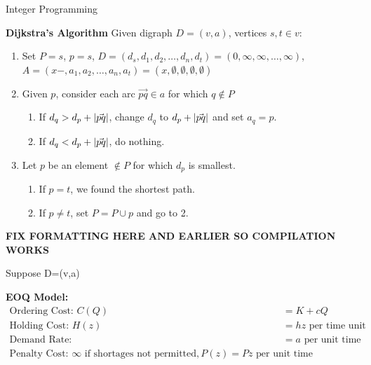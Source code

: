 \documentclass{article}
\begin{document}
\begin{section}{Integer Programming}
\begin{definition}{\textbf{Dijkstra's Algorithm}} 
    Given digraph \(D=(v,a)\), vertices \(s, t\in v\): \\
    \begin{enumerate}
        \item Set \(P={s}\), \(p=s\), \(D=(d_s, d_1, d_2, \dots, d_n, d_t)=(0, \infty, \infty, \dots, \infty)\), 
            \(A=(x-, a_1, a_2, \dots, a_n, a_t)=(x, \emptyset, \emptyset, \emptyset, \emptyset)\) 
        \item Given \(p\), consider each arc \(\vec{pq}\in a\) for which \(q \notin P\) 
            \begin{enumerate}
                \item If \(d_q>d_p+\abs{\vec{pq}}\), change \(d_q\) to \(d_p+\abs{\vec{pq}}\) and set \(a_q=p\). 
                \item If \(d_q<d_p+\abs{\vec{pq}}\), do nothing.     
            \end{enumerate}
        \item Let \(p\) be an element \(\notin P\) for which \(d_p\) is smallest. 
            \begin{enumerate}
                \item If \(p=t\), we found the shortest path.
                \item If \(p\neq t\), set \(P=P \cup {p}\) and go to 2.   
            \end{enumerate}   
    \end{enumerate}

    \textbf{FIX FORMATTING HERE AND EARLIER SO COMPILATION WORKS}
\end{definition}

\begin{eg}

\end{eg}

Suppose D=(v,a)

\textbf{EOQ Model:}\\
\begin{align*}
    \text{Ordering Cost: } C(Q)&=K+cQ \\
    \text{Holding Cost: } H(z)&=hz \text{ per time unit} \\
    \text{Demand Rate: } &=a \text{ per unit time}\\
    \text{Penalty Cost: } \infty \text{ if shortages not permitted}, P(z)=Pz \text{ per unit time}\\
\end{align*}


\end{section}
\end{document}
